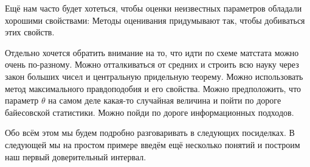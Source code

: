 \documentclass[12pt, a4paper, oneside]{article}
\begin{document}
Ещё нам часто будет хотеться, чтобы оценки неизвестных параметров обладали хорошими свойствами:  Методы оценивания придумывают так, чтобы добиваться этих свойств.  

Отдельно хочется обратить внимание на то, что идти по схеме матстата можно очень по-разному. Можно отталкиваться от средних и строить всю науку через закон больших чисел и центральную придельную теорему. Можно использовать метод максимального правдоподобия и его свойства. Можно предположить, что параметр $\theta$ на самом деле какая-то случайная величина и пойти по дороге байесовской статистики. Можно пойди по дороге информационных подходов. 

Обо всём этом мы будем подробно разговаривать в следующих посиделках. В следующей мы на простом примере введём ещё несколько понятий и построим наш первый доверительный интервал. 
\end{document}
